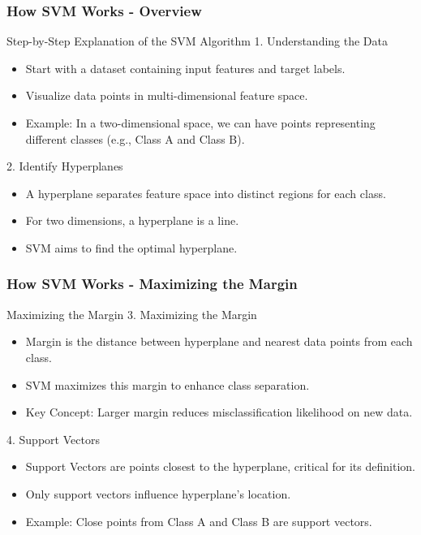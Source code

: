 \documentclass{beamer}
\begin{document}
\begin{frame}[fragile]
    \frametitle{How SVM Works - Overview}
    \begin{block}{Step-by-Step Explanation of the SVM Algorithm}
        1. Understanding the Data
        \begin{itemize}
            \item Start with a dataset containing input features and target labels.
            \item Visualize data points in multi-dimensional feature space.
            \item Example: In a two-dimensional space, we can have points representing different classes (e.g., Class A and Class B).
        \end{itemize}

        2. Identify Hyperplanes
        \begin{itemize}
            \item A hyperplane separates feature space into distinct regions for each class.
            \item For two dimensions, a hyperplane is a line.
            \item SVM aims to find the optimal hyperplane.
        \end{itemize}
    \end{block}
\end{frame}

\begin{frame}[fragile]
    \frametitle{How SVM Works - Maximizing the Margin}
    \begin{block}{Maximizing the Margin}
        3. Maximizing the Margin
        \begin{itemize}
            \item Margin is the distance between hyperplane and nearest data points from each class.
            \item SVM maximizes this margin to enhance class separation.
            \item Key Concept: Larger margin reduces misclassification likelihood on new data.
        \end{itemize}

        4. Support Vectors
        \begin{itemize}
            \item Support Vectors are points closest to the hyperplane, critical for its definition.
            \item Only support vectors influence hyperplane's location.
            \item Example: Close points from Class A and Class B are support vectors.
        \end{itemize}
    \end{block}
\end{frame}
\end{document}

